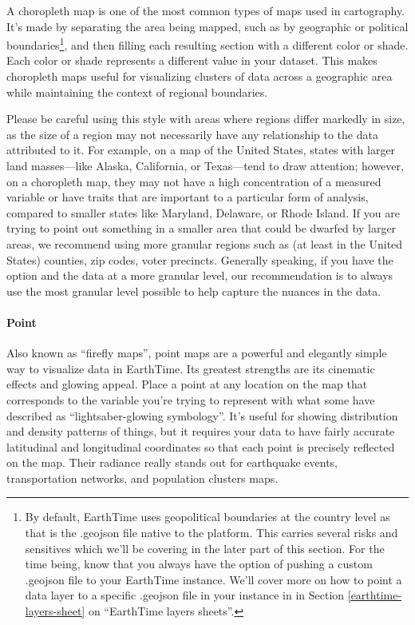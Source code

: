 \documentclass[
  12pt,
]{krantz}
\begin{document}
A choropleth map is one of the most common types of maps used in cartography. It's made by separating the area being mapped, such as by geographic or political boundaries\footnote{ By default, EarthTime uses geopolitical boundaries at the country level as that is the .geojson file native to the platform. This carries several risks and sensitives which we'll be covering in the later part of this section. For the time being, know that you always have the option of pushing a custom .geojson file to your EarthTime instance. We'll cover more on how to point a data layer to a specific .geojson file in your instance in in Section \ref{earthtime-layers-sheet} on ``EarthTime layers sheets''.}, and then filling each resulting section with a different color or shade. Each color or shade represents a different value in your dataset. This makes choropleth maps useful for visualizing clusters of data across a geographic area while maintaining the context of regional boundaries.

Please be careful using this style with areas where regions differ markedly in size, as the size of a region may not necessarily have any relationship to the data attributed to it. For example, on a map of the United States, states with larger land masses---like Alaska, California, or Texas---tend to draw attention; however, on a choropleth map, they may not have a high concentration of a measured variable or have traits that are important to a particular form of analysis, compared to smaller states like Maryland, Delaware, or Rhode Island. If you are trying to point out something in a smaller area that could be dwarfed by larger areas, we recommend using more granular regions such as (at least in the United States) counties, zip codes, voter precincts. Generally speaking, if you have the option and the data at a more granular level, our recommendation is to always use the most granular level possible to help capture the nuances in the data.

\hypertarget{point}{%
\paragraph*{Point}\label{point}}

Also known as ``firefly maps'', point maps are a powerful and elegantly simple way to visualize data in EarthTime. Its greatest strengths are its cinematic effects and glowing appeal. Place a point at any location on the map that corresponds to the variable you're trying to represent with what some have described as ``lightsaber-glowing symbology''. It's useful for showing distribution and density patterns of things, but it requires your data to have fairly accurate latitudinal and longitudinal coordinates so that each point is precisely reflected on the map. Their radiance really stands out for earthquake events, transportation networks, and population clusters maps.
\end{document}
